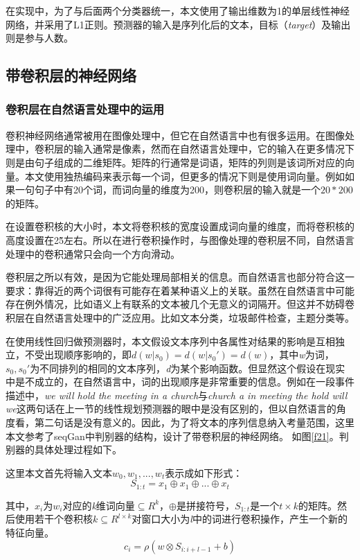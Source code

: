 在实现中，为了与后面两个分类器统一，本文使用了输出维数为1的单层线性神经网络，并采用了L1正则。预测器的输入是序列化后的文本，目标（\textit{target}）及输出则是参与人数。


\subsection{带卷积层的神经网络}
\subsubsection{卷积层在自然语言处理中的运用}
卷积神经网络通常被用在图像处理中，但它在自然语言中也有很多运用。在图像处理中，卷积层的输入通常是像素，然而在自然语言处理中，它的输入在更多情况下则是由句子组成的二维矩阵。矩阵的行通常是词语，矩阵的列则是该词所对应的向量。本文使用独热编码来表示每一个词，但更多的情况下则是使用词向量。例如如果一句句子中有20个词，而词向量的维度为200，则卷积层的输入就是一个$20*200$的矩阵。

在设置卷积核的大小时，本文将卷积核的宽度设置成词向量的维度，而将卷积核的高度设置在2\~5左右。所以在进行卷积操作时，与图像处理的卷积层不同，自然语言处理中的卷积通常只会向一个方向滑动。

卷积层之所以有效，是因为它能处理局部相关的信息。而自然语言也部分符合这一要求：靠得近的两个词很有可能存在着某种语义上的关联。虽然在自然语言中可能存在例外情况，比如语义上有联系的文本被几个无意义的词隔开。但这并不妨碍卷积层在自然语言处理中的广泛应用。比如文本分类，垃圾邮件检查，主题分类等。

在使用线性回归做预测器时，本文假设文本序列中各属性对结果的影响是互相独立，不受出现顺序影响的，即\(d(w|s_0)=d(w|s_0')=d(w)\)，其中\textit{w}为词，\(s_0,s_0'\)为不同排列的相同的文本序列，\textit{d}为某个影响函数。但显然这个假设在现实中是不成立的，在自然语言中，词的出现顺序是非常重要的信息。例如在一段事件描述中，\textit{we will hold the meeting in a church}与\textit{church a in meeting the hold will we}这两句话在上一节的线性规划预测器的眼中是没有区别的，但以自然语言的角度看，第二句话是没有意义的。因此，为了将文本的序列信息纳入考量范围，这里本文参考了seqGan中判别器的结构，设计了带卷积层的神经网络。
如图\ref{f21}。判别器的具体处理过程如下。

这里本文首先将输入文本\(w_0,w_1,...,w_t\)表示成如下形式：
\begin{equation}
S_{1:t}=x_1\oplus x_1\oplus...\oplus x_t
\end{equation}

其中，\(x_i\)为\(w_i\)对应的\textit{k}维词向量\(\subseteq R^k\)，\(\oplus\)是拼接符号，\(S_{1:t}\)是一个\(t\times k\)的矩阵。然后使用若干个卷积核\(k\subseteq R^{l\times k}\)对窗口大小为\textit{l}中的词进行卷积操作，产生一个新的特征向量。
\begin{equation}
c_i=\rho(w\otimes S_{i:i+l-1}+b)
\end{equation}

